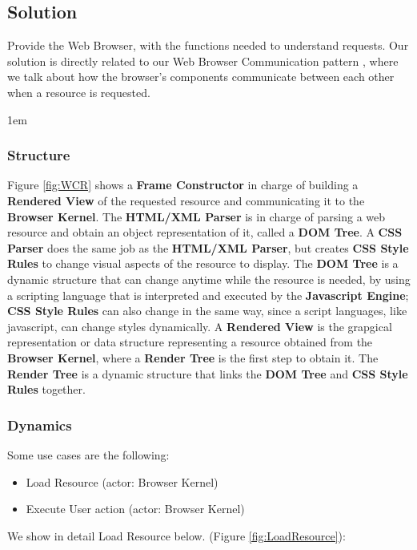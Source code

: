 \documentclass[prodmode,acmtecs]{acmsmall}
\begin{document}
  \begin{shaded}
  \subsection*{Solution}
  Provide the Web Browser, with the functions needed to understand requests. Our solution is directly related to our Web Browser Communication pattern \cite{silva2015}, where we talk about how the browser's components communicate between each other when a resource is requested. 

    \leftskip1em

    \subsubsection*{Structure}
    Figure \ref{fig:WCR} shows a \textbf{Frame Constructor} in charge of building a \textbf{Rendered View} of the requested resource and communicating it to the \textbf{Browser Kernel}. The \textbf{HTML/XML Parser} is in charge of parsing a web resource and obtain an object representation of it, called a \textbf{DOM Tree}. A \textbf{CSS Parser} does the same job as the \textbf{HTML/XML Parser}, but creates \textbf{CSS Style Rules} to change visual aspects of the resource to display. The \textbf{DOM Tree} is a dynamic structure that can change anytime while the resource is needed, by using a scripting language that is interpreted and executed by the \textbf{Javascript Engine}; \textbf{CSS Style Rules} can also change in the same way, since a script languages, like javascript, can change styles dynamically. A \textbf{Rendered View} is the grapgical representation or data structure representing a resource obtained from the \textbf{Browser Kernel}, where a \textbf{Render Tree} is the first step to obtain it. The \textbf{Render Tree} is a dynamic structure that links the \textbf{DOM Tree} and \textbf{CSS Style Rules} together.

    \subsubsection*{Dynamics}
    Some use cases are the following:
    \begin{itemize}\leftskip2.5em
      \item Load Resource (actor: Browser Kernel)

      \item Execute User action (actor: Browser Kernel)

    \end{itemize}
    We show in detail Load Resource below. (Figure \ref{fig:LoadResource}):

\end{shaded}
\end{document}
